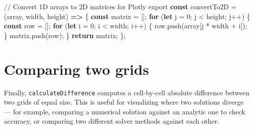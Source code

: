 \documentclass[
  letterpaper,
  DIV=11,
  numbers=noendperiod]{scrreprt}
\newenvironment{Shaded}{\begin{snugshade}}{\end{snugshade}}
\newcommand{\CommentTok}[1]{\textcolor[rgb]{0.37,0.37,0.37}{#1}}
\newcommand{\ControlFlowTok}[1]{\textcolor[rgb]{0.00,0.23,0.31}{\textbf{#1}}}
\newcommand{\DecValTok}[1]{\textcolor[rgb]{0.68,0.00,0.00}{#1}}
\newcommand{\FunctionTok}[1]{\textcolor[rgb]{0.28,0.35,0.67}{#1}}
\newcommand{\ImportTok}[1]{\textcolor[rgb]{0.00,0.46,0.62}{#1}}
\newcommand{\KeywordTok}[1]{\textcolor[rgb]{0.00,0.23,0.31}{\textbf{#1}}}
\newcommand{\NormalTok}[1]{\textcolor[rgb]{0.00,0.23,0.31}{#1}}
\newcommand{\OperatorTok}[1]{\textcolor[rgb]{0.37,0.37,0.37}{#1}}
\begin{document}
\label{helpers-grid-conversion}%
\begin{Shaded}
\begin{Highlighting}[]
\CommentTok{// Convert 1D arrays to 2D matrices for Plotly}
\ImportTok{export} \KeywordTok{const}\NormalTok{ convertTo2D }\OperatorTok{=}\NormalTok{ (array}\OperatorTok{,}\NormalTok{ width}\OperatorTok{,}\NormalTok{ height) }\KeywordTok{=\textgreater{}}\NormalTok{ \{}
    \KeywordTok{const}\NormalTok{ matrix }\OperatorTok{=}\NormalTok{ []}\OperatorTok{;}
    \ControlFlowTok{for}\NormalTok{ (}\KeywordTok{let}\NormalTok{ j }\OperatorTok{=} \DecValTok{0}\OperatorTok{;}\NormalTok{ j }\OperatorTok{\textless{}}\NormalTok{ height}\OperatorTok{;}\NormalTok{ j}\OperatorTok{++}\NormalTok{) \{}
        \KeywordTok{const}\NormalTok{ row }\OperatorTok{=}\NormalTok{ []}\OperatorTok{;}
        \ControlFlowTok{for}\NormalTok{ (}\KeywordTok{let}\NormalTok{ i }\OperatorTok{=} \DecValTok{0}\OperatorTok{;}\NormalTok{ i }\OperatorTok{\textless{}}\NormalTok{ width}\OperatorTok{;}\NormalTok{ i}\OperatorTok{++}\NormalTok{) \{}
\NormalTok{            row}\OperatorTok{.}\FunctionTok{push}\NormalTok{(array[j }\OperatorTok{*}\NormalTok{ width }\OperatorTok{+}\NormalTok{ i])}\OperatorTok{;}
\NormalTok{        \}}
\NormalTok{        matrix}\OperatorTok{.}\FunctionTok{push}\NormalTok{(row)}\OperatorTok{;}
\NormalTok{    \}}
    \ControlFlowTok{return}\NormalTok{ matrix}\OperatorTok{;}
\NormalTok{\}}\OperatorTok{;}
\end{Highlighting}
\end{Shaded}

\section{Comparing two grids}\label{comparing-two-grids}

Finally, \texttt{calculateDifference} computes a cell-by-cell absolute
difference between two grids of equal size. This is useful for
visualizing where two solutions diverge --- for example, comparing a
numerical solution against an analytic one to check accuracy, or
comparing two different solver methods against each other.
\end{document}
